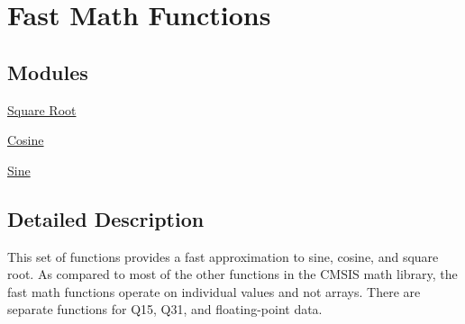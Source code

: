\hypertarget{group__group_fast_math}{\section{Fast Math Functions}
\label{group__group_fast_math}
}
\subsection*{Modules}
\begin{DoxyCompactItemize}
\item 
\hyperlink{group___s_q_r_t}{Square Root}
\item 
\hyperlink{group__cos}{Cosine}
\item 
\hyperlink{group__sin}{Sine}
\end{DoxyCompactItemize}


\subsection{Detailed Description}
This set of functions provides a fast approximation to sine, cosine, and square root. As compared to most of the other functions in the C\-M\-S\-I\-S math library, the fast math functions operate on individual values and not arrays. There are separate functions for Q15, Q31, and floating-\/point data. 